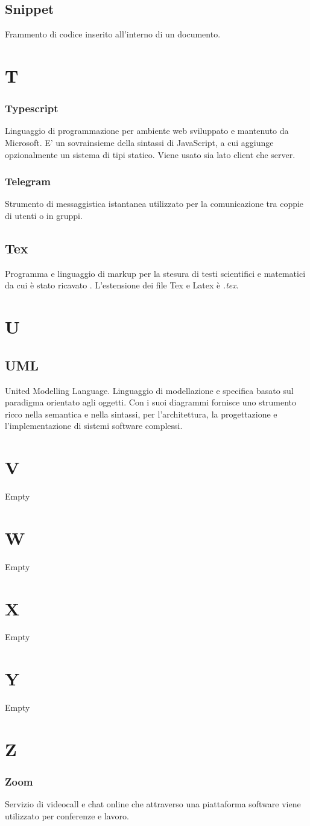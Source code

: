 \subsection*{Snippet}
Frammento di codice inserito all'interno di un documento.

\section*{T}
\subsubsection*{Typescript}
Linguaggio di programmazione per ambiente web sviluppato e mantenuto da Microsoft. E' un sovrainsieme della sintassi di JavaScript,
a cui aggiunge opzionalmente un sistema di tipi statico. Viene usato sia lato client che server.
\subsubsection*{Telegram}
Strumento di messaggistica istantanea utilizzato per la comunicazione tra coppie di utenti o in gruppi.

\subsection*{Tex}
Programma e linguaggio di markup per la stesura di testi scientifici e matematici da cui è stato ricavato . L'estensione dei file Tex e Latex è \textit{.tex}.

\section*{U}

\subsection*{UML}
United Modelling Language. Linguaggio di modellazione e specifica basato sul paradigma orientato agli oggetti. Con i suoi diagrammi fornisce uno strumento  ricco nella semantica e nella sintassi, per l'architettura, la progettazione e l'implementazione di sistemi software complessi.

\section*{V}
Empty

\section*{W}
Empty

\section*{X}
Empty

\section*{Y}
Empty

\section*{Z}
\subsubsection*{Zoom}
Servizio di videocall e chat online che attraverso una piattaforma software viene utilizzato per conferenze e lavoro.
